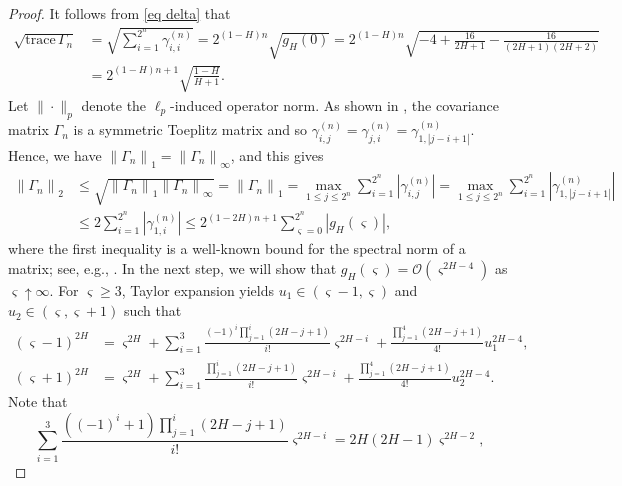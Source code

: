 \documentclass[12pt,reqno]{article}
\def\trace#1{\text{trace}\, #1}
\newcommand{\norm}[1]{\left\lVert {#1}\right\rVert}
\def\ua{\uparrow}
\numberwithin{equation}{section}
\theoremstyle{definition}
\def\ua{\uparrow}
\begin{document}
\begin{proof}
It follows from \eqref{eq delta} that	
\begin{equation}\label{eq Tn fbm}
	\begin{split}
	\sqrt{\trace{\Gamma_n}} &= \sqrt{\sum_{i = 1}^{2^n} \gamma^{(n)}_{i,i}} = 2^{(1-H)n}\sqrt{g_H(0)}=2^{(1-H)n}\sqrt{-4 + \frac{16}{2H+1} - \frac{16}{(2H+1)(2H+2)}} \\&=  2^{(1-H)n+1}\sqrt{\frac{1-H}{H+1}}.
	\end{split}
	\end{equation}
	Let $\|\cdot\|_p$ denote the $\ell_p$-induced operator norm. As shown in , the covariance matrix $\Gamma_n$ is a symmetric Toeplitz matrix and so $\gamma^{(n)}_{i,j} = \gamma^{(n)}_{j,i} = \gamma^{(n)}_{1,|j-i+1|}$. Hence, we have $\norm{\Gamma_n}_1 = \norm{\Gamma_n}_{\infty}$, and this gives
	\begin{equation}\label{eq Gamma 2 norm}
	\begin{split}
	\norm{\Gamma_n}_2 &\le \sqrt{\norm{\Gamma_n}_1\norm{\Gamma_n}_{\infty}} = \norm{\Gamma_n}_1 = \max_{1 \le j \le 2^n}\sum_{i = 1}^{2^n}|\gamma^{(n)}_{i,j}| = \max_{1 \le j \le 2^n}\sum_{i = 1}^{2^n}|\gamma^{(n)}_{1,|j-i+1|}|\\&\le 2\sum_{i=1}^{2^{n}}|\gamma^{(n)}_{1,i}| \le 2^{(1-2H)n+1}\sum_{\varsigma = 0}^{2^n}|g_H(\varsigma)|,
	\end{split}
	\end{equation}
	where the first inequality is a well-known bound for the spectral norm of a matrix; see, e.g., \cite[proof of Theorem 2.3]{Viitasaari}.
		In the next step, we will show that $g_H(\varsigma) = \mathcal{O}(\varsigma^{2H-4})$ as $\varsigma \ua \infty$.   For $\varsigma \ge 3$, Taylor expansion yields $u_1 \in (\varsigma-1, \varsigma)$ and $u_2 \in (\varsigma, \varsigma+1)$ such that
	\begin{equation*}
	\begin{split}
	(\varsigma - 1)^{2H}  &= \varsigma^{2H} + \sum_{i = 1}^{3}\frac{(-1)^i\prod_{j = 1}^{i}(2H-j+1)}{i!} \varsigma^{2H-i}+ \frac{\prod_{j = 1}^{4}(2H-j+1)}{4!}u_1^{2H-4},\\
	(\varsigma + 1)^{2H}  &= \varsigma^{2H} + \sum_{i = 1}^{3}\frac{\prod_{j = 1}^{i}(2H-j+1)}{i!}\varsigma^{2H-i} + \frac{\prod_{j = 1}^{4}(2H-j+1)}{4!}u_2^{2H-4}.
	\end{split}
	\end{equation*}
 Note that 
	\begin{equation*}
	\sum_{i = 1}^{3}\frac{\left((-1)^i + 1\right)\prod_{j = 1}^{i}(2H-j+1)}{i!} \varsigma^{2H-i}= 2H(2H-1)\varsigma^{2H-2},

\end{equation*}
\end{proof}
\end{document}
